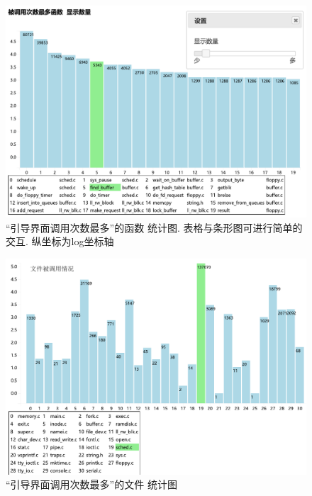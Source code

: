 \documentclass[]{report}
\begin{document}
\begin{figure}[htbp]
    \centering
    \includegraphics[width=\textwidth,natwidth=594 ,natheight=419]{img/calledMaxFunc.pdf}
    \caption[]{“引导界面调用次数最多”的函数 统计图. 表格与条形图可进行简单的交互. 纵坐标为log坐标轴}
    \label{fig:calledMaxFuncgraph}
\end{figure}

\begin{figure}[htbp]
    \centering
    \includegraphics[width=\textwidth,natwidth=577 ,natheight=416]{img/calledFile.pdf}
    \caption[]{“引导界面调用次数最多”的文件 统计图}
    \label{fig:calledMaxFilegraph}
\end{figure}
\end{document}
